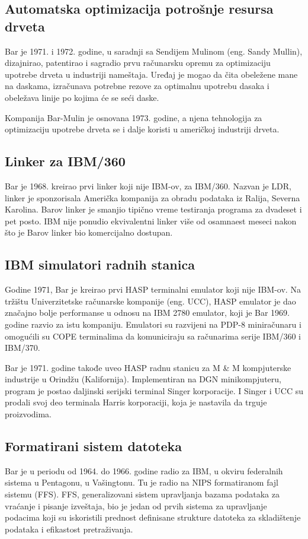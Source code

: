 \documentclass[a4paper]{article}
\begin{document}
{		\subsection{Automatska optimizacija potrošnje resursa drveta}
		Bar je 1971. i 1972. godine, u saradnji sa Sendijem Mulinom (eng. Sandy Mullin), dizajnirao, patentirao i sagradio prvu računarsku opremu za optimizaciju upotrebe drveta u industriji nameštaja. Uređaj je mogao da čita obeležene mane na daskama, izračunava potrebne rezove za optimalnu upotrebu dasaka i obeležava linije po kojima će se seći daske.\cite{helmers}
		
		Kompanija Bar-Mulin je osnovana 1973. godine, a njena tehnologija za optimizaciju upotrebe drveta se i dalje koristi u američkoj industriji drveta.\cite{cox} 
		
		\subsection{Linker za IBM/360}
		Bar je 1968. kreirao prvi linker koji nije IBM-ov, za IBM/360. Nazvan je LDR, linker je sponzorisala Američka kompanija za obradu podataka iz Ralija, Severna Karolina. Barov linker je smanjio tipično vreme testiranja programa za dvadeset i pet posto.\cite{linker} \cite{ibm} IBM nije ponudio ekvivalentni linker više od osamnaest meseci nakon što je Barov linker bio komercijalno dostupan.
		
		\subsection{IBM simulatori radnih stanica}
		Godine 1971, Bar je kreirao prvi HASP terminalni emulator koji nije IBM-ov. Na tržištu Univerzitetske računarske kompanije (eng. UCC), HASP emulator je dao značajno bolje performanse u odnosu na IBM 2780 emulator, koji je Bar 1969. godine razvio za istu kompaniju. Emulatori su razvijeni na PDP-8 miniračunaru i omogućili su COPE terminalima da komuniciraju sa računarima serije IBM/360 i IBM/370.
		
		Bar je 1971. godine takođe uveo HASP radnu stanicu za M \&  M kompjuterske industrije u Orindžu (Kalifornija). Implementiran na DGN minikompjuteru, program je postao daljinski serijski terminal Singer korporacije. I Singer i UCC su prodali svoj deo terminala Harris korporaciji, koja je nastavila da trguje proizvodima.
		
		\subsection{Formatirani sistem datoteka}
		Bar je u periodu od 1964. do 1966. godine radio za IBM, u okviru federalnih sistema u Pentagonu, u Vašingtonu. Tu je radio na NIPS formatiranom fajl sistemu (FFS). FFS, generalizovani sistem upravljanja bazama podataka za vraćanje i pisanje izveštaja, bio je jedan od prvih sistema za upravljanje podacima koji su iskoristili prednost definisane strukture datoteka za skladištenje podataka i efikastost pretraživanja.
		
}
\end{document}
